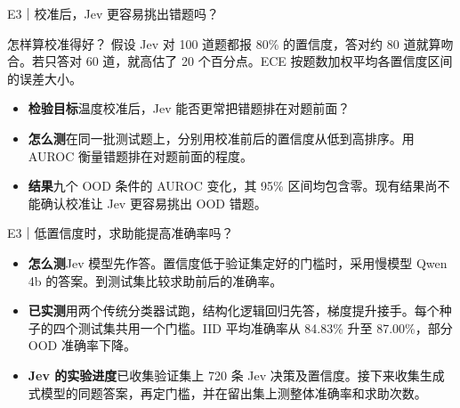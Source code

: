 \documentclass{beamer}
\begin{document}
\begin{frame}{E3｜校准后，Jev 更容易挑出错题吗？}
  \small
  \begin{block}{怎样算校准得好？}
    假设 Jev 对 100 道题都报 80\% 的置信度，答对约 80 道就算吻合。若只答对 60 道，就高估了 20 个百分点。ECE 按题数加权平均各置信度区间的误差大小。
  \end{block}

  \begin{itemize}
    \item \textbf{检验目标}\quad 温度校准后，Jev 能否更常把错题排在对题前面？
    \item \textbf{怎么测}\quad 在同一批测试题上，分别用校准前后的置信度从低到高排序。用 AUROC 衡量错题排在对题前面的程度。
    \item \textbf{结果}\quad 九个 OOD 条件的 AUROC 变化，其 95\% 区间均包含零。现有结果尚不能确认校准让 Jev 更容易挑出 OOD 错题。
  \end{itemize}
\end{frame}

\begin{frame}{E3｜低置信度时，求助能提高准确率吗？}
  \small
  \begin{itemize}
    \item \textbf{怎么测}\quad Jev 模型先作答。置信度低于验证集定好的门槛时，采用慢模型 Qwen 4b 的答案。到测试集比较求助前后的准确率。
    \item \textbf{已实测}\quad 用两个传统分类器试跑，结构化逻辑回归先答，梯度提升接手。每个种子的四个测试集共用一个门槛。IID 平均准确率从 84.83\% 升至 87.00\%，部分 OOD 准确率下降。
    \item \textbf{Jev 的实验进度}\quad 已收集验证集上 720 条 Jev 决策及置信度。接下来收集生成式模型的同题答案，再定门槛，并在留出集上测整体准确率和求助次数。
  \end{itemize}
\end{frame}
\end{document}
